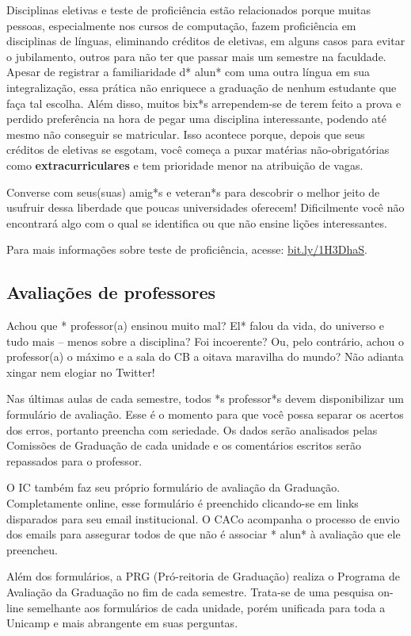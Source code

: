 Disciplinas eletivas e teste de proficiência estão relacionados porque muitas
pessoas, especialmente nos cursos de computação, fazem proficiência em
disciplinas de línguas, eliminando créditos de eletivas, em alguns casos para
evitar o jubilamento, outros para não ter que passar mais um semestre na
faculdade. Apesar de registrar a familiaridade d* alun* com uma outra língua em
sua integralização, essa prática não enriquece a graduação de nenhum estudante
que faça tal escolha. Além disso, muitos bix*s arrependem-se de terem feito a
prova e perdido preferência na hora de pegar uma disciplina interessante,
podendo até mesmo não conseguir se matricular. Isso acontece porque, depois que
seus créditos de eletivas se esgotam, você começa a puxar matérias
não-obrigatórias como \textbf{extracurriculares} e tem prioridade menor na
atribuição de vagas.

Converse com seus(suas) amig*s e veteran*s para descobrir o melhor jeito de usufruir
dessa liberdade que poucas universidades oferecem! Dificilmente você não
encontrará algo com o qual se identifica ou que não ensine lições interessantes.

Para mais informações sobre teste de proficiência, acesse:
\url{bit.ly/1H3DhaS}.

\subsection{Avaliações de professores}

Achou que * professor(a) ensinou muito mal? El* falou da vida, do universo e tudo
mais -- menos sobre a disciplina? Foi incoerente? Ou, pelo contrário, achou o
professor(a) o máximo e a sala do CB a oitava maravilha do mundo? Não adianta
xingar nem elogiar no Twitter!

Nas últimas aulas de cada semestre, todos *s professor*s devem disponibilizar um
formulário de avaliação. Esse é o momento para que você possa separar os acertos
dos erros, portanto preencha com seriedade. Os dados serão analisados pelas
Comissões de Graduação de cada unidade e os comentários escritos serão
repassados para o professor.

O IC também faz seu próprio formulário de avaliação da Graduação. Completamente
online, esse formulário é preenchido clicando-se em links disparados para seu
email institucional. O CACo acompanha o processo de envio dos emails para
assegurar todos de que não é associar * alun* à avaliação que ele preencheu.

Além dos formulários, a PRG (Pró-reitoria de Graduação) realiza o Programa de
Avaliação da Graduação no fim de cada semestre. Trata-se de uma pesquisa on-line
semelhante aos formulários de cada unidade, porém unificada para toda a Unicamp
e mais abrangente em suas perguntas.

